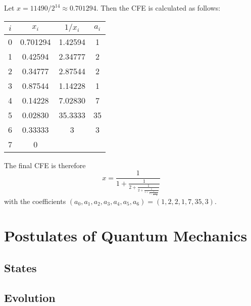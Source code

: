         \begin{example}
        	Let \( x = \num{11490} / 2^{14} \approx 0.701294 \). Then the \ac{CFE} is calculated as follows:
        	\begin{center}
        		\begin{tabular}{c|ccc}
        			\toprule
        			 \(i\)  &    \(x_i\)     &  \(1 / x_i\)  & \(a_i\)  \\ \midrule
        			\num{0} & \num{0.701294} & \num{1.42594} & \num{1}  \\ \bottomrule
        			\num{1} & \num{0.42594}  & \num{2.34777} & \num{2}  \\ \bottomrule
        			\num{2} & \num{0.34777}  & \num{2.87544} & \num{2}  \\ \bottomrule
        			\num{3} & \num{0.87544}  & \num{1.14228} & \num{1}  \\ \bottomrule
        			\num{4} & \num{0.14228}  & \num{7.02830} & \num{7}  \\ \bottomrule
        			\num{5} & \num{0.02830}  & \num{35.3333} & \num{35} \\ \bottomrule
        			\num{6} & \num{0.33333}  &    \num{3}    & \num{3}  \\ \bottomrule
        			\num{7} &    \num{0}     &               &          \\ \bottomrule
        		\end{tabular}
        	\end{center}
        	The final \ac{CFE} is therefore
        	\begin{equation}
        		x = \frac{1}{1 + \frac{1}{2 + \frac{1}{2 + \frac{1}{1 + \frac{1}{7 + \frac{1}{35 + \frac{1}{3}}}}}}}
        	\end{equation}
        	with the coefficients \( (a_0, a_1, a_2, a_3, a_4, a_5, a_6) = (1, 2, 2, 1, 7, 35, 3) \).
        \end{example}

\chapter{Postulates of Quantum Mechanics} %

    \section{States} %

    \section{Evolution} %

